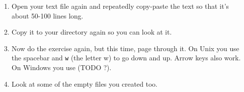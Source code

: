 \begin{enumerate}
\item Open your text file again and repeatedly copy-paste the text so that it's about 50-100 lines long.
\item Copy it to your  directory again so you can look at it.
\item Now do the exercise again, but this time, page through it.  On Unix you use
    the spacebar and \verb|w| (the letter w) to go down and up.  Arrow keys also work.  On Windows you use (TODO ?).
\item Look at some of the empty files you created too.
\end{enumerate}

